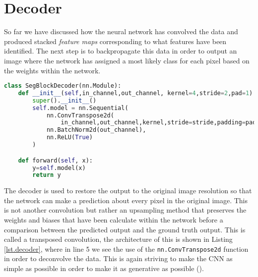\section{Decoder}
So far we have discussed how the neural network has convolved the data and produced stacked \textit{feature maps} corresponding to what features have been identified. The next step is to backpropagate this data in order to output an image where the network has assigned a most likely class for each pixel based on the weights within the network. 
\begin{lstlisting}[language=Python, caption = {Decoder architecture, works in the opposite way to the Encoder to transpose so that dimensions match that of the ground truth for comparison.}, label={lst.decoder},float,floatplacement=htbp]
class SegBlockDecoder(nn.Module):
    def __init__(self,in_channel,out_channel, kernel=4,stride=2,pad=1):
        super().__init__()
        self.model = nn.Sequential(
            nn.ConvTranspose2d(
                in_channel,out_channel,kernel,stride=stride,padding=pad,bias=False),
            nn.BatchNorm2d(out_channel),
            nn.ReLU(True)
        )

    def forward(self, x):
        y=self.model(x)
        return y
\end{lstlisting}
The decoder is used to restore the output to the original image resolution so that the network can make a prediction about every pixel in the original image. This is not another convolution but rather an upsampling method that preserves the weights and biases that have been calculate within the network before a comparison between the predicted output and the ground truth output. This is called a transposed convolution, the architecture of this is shown in Listing \ref{lst.decoder}, where in line 5 we see the use of the \texttt{nn.ConvTranspose2d} function in order to deconvolve the data. This is again striving to make the CNN as simple as possible in order to make it as generative as possible (\cite{Springenberg14}).

